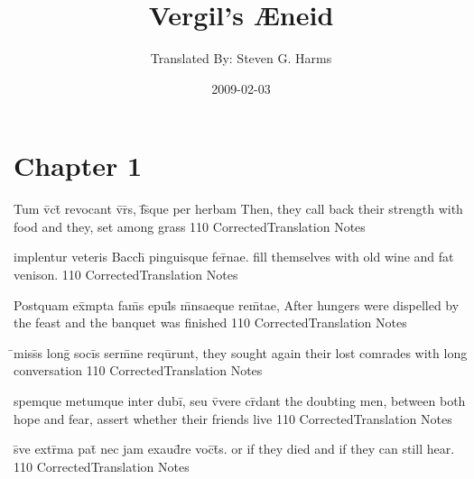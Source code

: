 \documentclass[]{book}
\title{Vergil's {\AE}neid}
\author{ Translated By:  Steven G. Harms }
\date{2009-02-03}
\begin{document}

\ifpdf
{}
\else
{}
\fi

\enumstyle 

\maketitle
\tableofcontents

\chapter{Chapter 1}
%
%
%
%
%
%
%

\latline
  {Tum v\={\macron {\i}}ct\={} revocant v\={\macron {\i}}r\={\macron {\i}}s, f\={}s\={\macron {\i}}que per herbam}
  { Then, they call back their strength with food and they, set among grass }
  {110}
  { CorrectedTranslation }
  { Notes }


\latline
  {implentur veteris Bacch\={\macron {\i}} pinguisque fer\={\macron {\i}}nae.}
  { fill themselves with old wine and fat venison. }
  {110}
  { CorrectedTranslation }
  { Notes }


\latline
  {Postquam ex\={}mpta fam\={}s epul\={\macron {\i}}s m\={}nsaeque rem\={}tae,}
  { After hungers were dispelled by the feast and the banquet was finished }
  {110}
  { CorrectedTranslation }
  { Notes }


\latline
  {\={}miss\={}s long\={} soci\={}s serm\={}ne requ\={\macron {\i}}runt,}
  { they sought again their lost comrades with long conversation }
  {110}
  { CorrectedTranslation }
  { Notes }


\latline
  {spemque metumque inter dubi\={\macron {\i}}, seu v\={\macron {\i}}vere cr\={}dant}
  { the doubting men, between both hope and fear, assert whether their friends live }
  {110}
  { CorrectedTranslation }
  { Notes }


\latline
  {s\={\macron {\i}}ve extr\={}ma pat\={\macron {\i}} nec jam exaud\={\macron {\i}}re voc\={}t\={}s.}
  { or if they died and if they can still hear. }
  {110}
  { CorrectedTranslation }
  { Notes }
\end{document}
